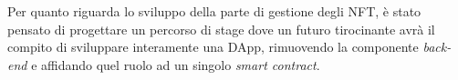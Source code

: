 Per quanto riguarda lo sviluppo della parte di gestione degli NFT, è stato pensato di progettare un percorso di stage dove un futuro tirocinante avrà il compito di sviluppare interamente una \gls{DApp}, rimuovendo la componente \textit{back-end} e affidando quel ruolo ad un singolo \textit{smart contract}.
